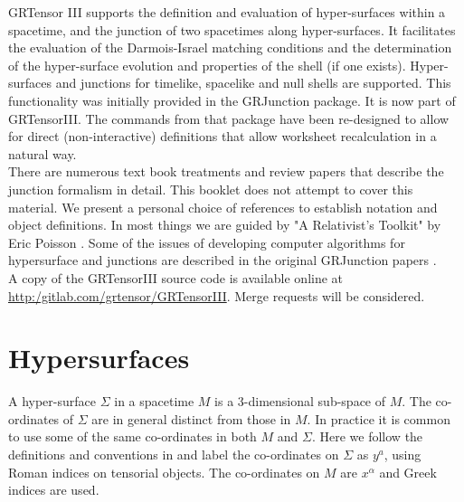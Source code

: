\documentclass{article}
\begin{document}
\grtitle{\grHyperTitle}
\grlabel{\grHyperLabel}
\grtitlepage
%
\copyrightpage
\noindent 
GRTensor III supports the definition and evaluation of hyper-surfaces within a spacetime, and the junction
of two spacetimes along hyper-surfaces. It facilitates the evaluation of the Darmois-Israel matching conditions
and the determination of the hyper-surface evolution and properties of the shell (if one exists). 
Hyper-surfaces and junctions for timelike, spacelike and null shells are supported. This functionality was
initially provided in the GRJunction package. It is now part of GRTensorIII. The commands from that package have been re-designed to allow for
direct (non-interactive) definitions that allow worksheet recalculation in a natural way. \\

There are numerous text book treatments and review papers that describe the junction formalism in detail. This
booklet does not attempt to cover this material. We present a personal choice of references to establish notation
and object definitions. In most things we are guided by "A Relativist's Toolkit" by Eric Poisson \cite{poisson:2004}.
Some of the issues of developing computer algorithms for hypersurface and junctions are described in the original 
GRJunction papers \cite{musgravelake:1994, musgravelake:1997}. \\

A copy of the GRTensorIII source code is available online at 
\href{url}{http:/gitlab.com/grtensor/GRTensorIII}. Merge requests
will be considered. \\

%
\section{Hypersurfaces}
A hyper-surface $\Sigma$ in a spacetime $M$ is a 3-dimensional sub-space of $M$. The co-ordinates of $\Sigma$ are in 
general distinct from those in $M$. In practice it is common to use some of the same co-ordinates in both $M$ and $\Sigma$. 
Here we follow the definitions and conventions in \cite{toolkit} and label the co-ordinates on $\Sigma$ as $y^a$, using Roman indices on tensorial objects. The co-ordinates on $M$ are $x^\alpha$ and Greek indices are used. \\
\end{document}
